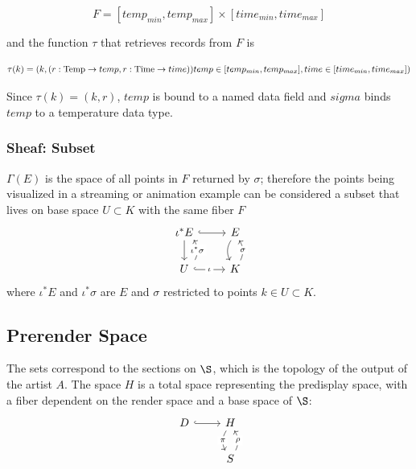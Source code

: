 \documentclass[../main.tex]{subfiles}
\begin{document}
\begin{equation}
F = [temp_{min}, temp_{max}] \times [time_{min}, time_{max}]
\end{equation}

and the function $\tau$ that retrieves records from $F$ is

\begin{equation}
\tau(k) =(k, (r: \textrm{Temp}\rightarrow temp, r: \textrm{Time}\rightarrow time))\\
temp \in [temp_{min}, temp_{max}], time \in [time_{min}, time_{max}])
\end{equation}

Since $\tau(k)=(k, r)$, $temp$ is bound to a named data field and $sigma$ binds $temp$ to a temperature data type. 

\subsubsection{Sheaf: Subset}
$\Gamma(E)$ is the space of all points in $F$ returned by $\sigma$; therefore the points being visualized in a streaming or animation example can be considered a subset that lives on base space $U \subset K$ with the same fiber $F$
\begin{equation}
    \begin{tikzcd}
        \iota^\ast E \arrow[r, hook] \arrow[d]                                                                       & E \arrow[d, bend right]                       \\
        U \arrow[r, "\iota" description, hook] \arrow[u, "\iota^\ast \sigma" description, bend right, shift right=2] & K \arrow[u, "\sigma" description, bend right]
    \end{tikzcd}    
\end{equation}
where $\iota^*E$ and $\iota^*\sigma$ are $E$ and $\sigma$ restricted to points $k \in U \subset K$.   


\subsection{Prerender Space}
\label{sec:display}



The sets correspond to the sections on $\S$, which is the topology of the output of the artist $A$. The space $H$ is a total space representing the predisplay space, with a fiber dependent on the render space and a base space of $\S$:
\begin{equation}
    \begin{tikzcd}
        D \arrow[r, hook] & H \arrow[d, "\pi" description, bend right] \\
                                    & S \arrow[u, "\rho" description, bend right] 
    \end{tikzcd}
\end{equation}
\end{document}
